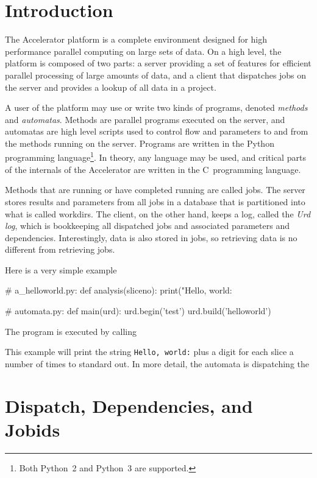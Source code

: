 
\section{Introduction}

The Accelerator platform is a complete environment designed for high
performance parallel computing on large sets of data.  On a high
level, the platform is composed of two parts: a server providing a set
of features for efficient parallel processing of large amounts of
data, and a client that dispatches jobs on the server and provides a
lookup of all data in a project.

A user of the platform may use or write two kinds of programs, denoted
\textsl{methods} and \textsl{automatas}.  Methods are parallel
programs executed on the server, and automatas are high level scripts
used to control flow and parameters to and from the methods running on
the server.  Programs are written in the Python programming
language\footnote{Both Python~2 and Python~3 are supported.}.  In
theory, any language may be used, and critical parts of the internals
of the Accelerator are written in the C~programming language.

Methods that are running or have completed running are called jobs.
The server stores results and parameters from all jobs in a database
that is partitioned into what is called workdirs.  The client, on the
other hand, keeps a log, called the \textsl{Urd log}, which is
bookkeeping all dispatched jobs and associated parameters and
dependencies.  Interestingly, data is also stored in jobs, so
retrieving data is no different from retrieving jobs.

Here is a very simple example
\begin{python}
# a_helloworld.py:
def analysis(sliceno):
  print("Hello, world: %

# automata.py:
def main(urd):
  urd.begin('test')
  urd.build('helloworld')
\end{python}
The program is executed by calling
\begin{shell}
\end{shell}
This example will print the string \texttt{Hello, world:} plus a digit
for each slice a number of
times to standard
out.  In more detail, the automata is dispatching the



\section{Dispatch, Dependencies, and Jobids}


